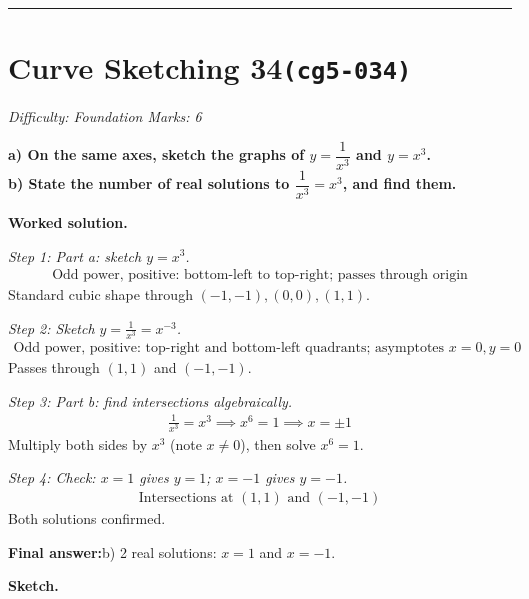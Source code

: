 \documentclass[11pt]{article}
\newcommand{\question}[1]{\par\medskip\noindent\textbf{#1}\par}
\begin{document}
\medskip\hrule

\section*{Curve Sketching 34\quad\small\texttt{(cg5-034)}}
\textit{Difficulty: Foundation \quad\textbar\quad Marks: 6}

\question{a) On the same axes, sketch the graphs of \( y = \dfrac{1}{x^3} \) and \( y = x^3 \). \\[3pt] b) State the number of real solutions to \( \dfrac{1}{x^3} = x^3 \), and find them.}

\textbf{Worked solution.}

\textit{Step 1: Part a: sketch \( y = x^3 \).}
\[\begin{gathered}
\text{Odd power, positive: bottom-left to top-right; passes through origin}
\end{gathered}\]
Standard cubic shape through \( (-1,-1), (0,0), (1,1) \).

\textit{Step 2: Sketch \( y = \frac{1}{x^3} = x^{-3} \).}
\[\begin{gathered}
\text{Odd power, positive: top-right and bottom-left quadrants; asymptotes } x=0, y=0
\end{gathered}\]
Passes through \( (1,1) \) and \( (-1,-1) \).

\textit{Step 3: Part b: find intersections algebraically.}
\[\begin{gathered}
\frac{1}{x^3} = x^3 \implies x^6 = 1 \implies x = \pm 1
\end{gathered}\]
Multiply both sides by \( x^3 \) (note \( x \neq 0 \)), then solve \( x^6 = 1 \).

\textit{Step 4: Check: \( x = 1 \) gives \( y = 1 \); \( x = -1 \) gives \( y = -1 \).}
\[\begin{gathered}
\text{Intersections at } (1, 1) \text{ and } (-1, -1)
\end{gathered}\]
Both solutions confirmed.

\begin{answerbox}
\textbf{Final answer:}\quad b) 2 real solutions: \(\displaystyle x = 1\) and \(\displaystyle x = -1\).
\end{answerbox}
\textbf{Sketch.}
\end{document}
